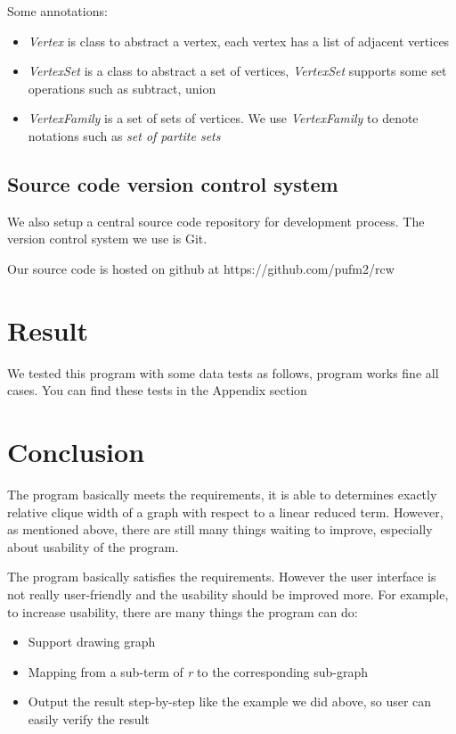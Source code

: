 \documentclass[a4paper, 12pt]{article}
\begin{document}
Some annotations:
\begin{itemize}
\item \textit {Vertex} is class to abstract a vertex, each vertex has a list of adjacent vertices
\item \textit {VertexSet} is a class to abstract a set of vertices, \textit {VertexSet} supports some set operations such as subtract, union
\item \textit {VertexFamily} is a set of sets of vertices. We use \textit {VertexFamily} to denote notations such as \textit {set of partite sets}
\end{itemize}

\subsection{Source code version control system}

We also setup a central source code repository for development process. The version control system we use is Git.

Our source code is hosted on github at https://github.com/pufm2/rcw

\section {Result}
We tested this program with some data tests as follows, program works fine all cases. You can find these tests in the Appendix section


\section {Conclusion}
The program basically meets the requirements, it is able to determines exactly relative clique width of a graph with respect to a linear reduced term. However, as mentioned above, there are still many things waiting to improve, especially about usability of the program.

The program basically satisfies the requirements. However the user interface is not really user-friendly and the usability should be improved more. For example, to increase usability, there are many things the program can do: 
\begin{itemize}
\item Support drawing graph 
\item Mapping from a sub-term of \textit {r} to the corresponding sub-graph 
\item Output the result step-by-step like the example we did above, so user
can easily verify the result 
\end{itemize}
\end{document}
